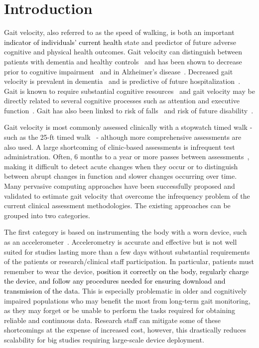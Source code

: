 \documentclass[journal]{IEEEtran}
\newcommand{\ca}[1]{\textcolor{black}{#1}}
\begin{document}
\section{Introduction}
Gait velocity, also referred to as the speed of walking, is both an important \ca{indicator of individuals' current health} state and predictor of future adverse cognitive and physical health outcomes.  Gait velocity can distinguish between patients with dementia and healthy controls~\cite{bruce2012relationship} and has been shown to decrease prior to cognitive impairment~\cite{buracchio2010trajectory} and in Alzheimer's disease~\cite{Goldman1999}.  Decreased gait velocity is prevalent in dementia~\cite{Beauchet2008} and is predictive of future hospitalization~\cite{Studenski2003}.  Gait is known to require substantial cognitive resources~\cite{Faulkner2006} and gait velocity may be directly related to several cognitive processes such as attention and executive function~\cite{Holtzer2006,Holtzer2012}.  Gait has also been linked to risk of falls~\cite{Kelsey2012,Cuaya2013} and risk of future disability~\cite{Guralnik2000a,studenski2011gait}.

Gait velocity is most commonly assessed clinically with a stopwatch timed walk - such as the 25-ft timed walk~\cite{Larson2013} - although more comprehensive assessments are also used.  A large shortcoming of clinic-based assessments is infrequent test administration.  Often, 6 months to a year or more passes between assessments~\cite{hagler2010unobtrusive}, making it difficult to detect acute changes when they occur or to distinguish between abrupt changes in function and slower changes occurring over time.  Many pervasive computing approaches have been successfully proposed and validated to estimate gait velocity that overcome the infrequency problem of the current clinical assessment methodologies. The existing approaches can be grouped into two categories.  

The first category is based on instrumenting the body with a worn device, such as an accelerometer~\cite{Culhane2005,Gietzelt2013,Dalton2013}.  Accelerometry is accurate and effective but is not well suited for studies lasting more than a few days without substantial requirements of the patients or research/clinical staff participation.  In particular, patients must remember to wear the device, 
\ca{position it correctly on the body, regularly charge the device, and follow any procedures needed for ensuring download and transmission of the data.}
This is especially problematic in older and cognitively impaired populations who may benefit the most from long-term gait monitoring, as they may forget or be unable to perform the tasks required for obtaining reliable and continuous data.  Research staff can mitigate some of these shortcomings at the expense of increased cost, however, this drastically reduces scalability for big studies requiring large-scale device deployment.  
\end{document}
